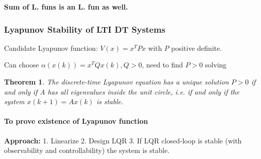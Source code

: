 \documentclass[8pt,a4paper]{scrartcl}
\newtheorem{theorem}{Theorem}
\begin{document}
\begin{multicols*}{3}
\begin{multicols*}{4}
\textbf{Sum of L. funs is an L. fun as well.}

\subsubsection{Lyapunov Stability of LTI DT Systems}

Candidate Lyapunov function: $V(x)=x^TPx$ with $P$ positive definite.


Can choose $\alpha(x(k))=x^TQx(k),Q>0$, need to find $P>0$ solving


\begin{theorem}The discrete-time Lyapunov equation has a unique solution $P>0$ if and only if A has all eigenvalues inside the unit circle, i.e. if and only if the system $x(k+1)=Ax(k)$ is stable.
\end{theorem}



\paragraph{To prove existence of Lyapunov function}


\textbf{Approach: } 1. Linearize 2. Design LQR 3. If LQR closed-loop is stable (with observability and controllability) the system is stable.


\end{multicols*}
\end{multicols*}
\end{document}
